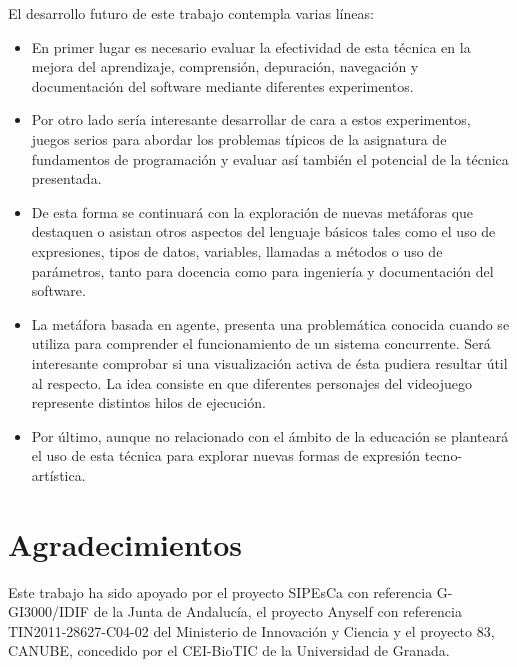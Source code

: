 \documentclass{llncs}
\begin{document}
El desarrollo futuro de este trabajo contempla varias líneas:
\begin{itemize}
\item En primer lugar es necesario evaluar la efectividad de esta técnica en la mejora del aprendizaje, comprensión, depuración, navegación y documentación del software mediante diferentes experimentos.
\item Por otro lado sería interesante desarrollar de cara a estos experimentos, juegos serios para abordar los problemas típicos de la asignatura de fundamentos de programación y evaluar así también el potencial de la técnica presentada.
\item De esta forma se continuará con la exploración de nuevas metáforas que destaquen o asistan otros aspectos del lenguaje básicos tales como el uso de expresiones, tipos de datos, variables, llamadas a métodos o uso de parámetros, tanto para docencia como para ingeniería y documentación del software.

\item La metáfora basada en agente, presenta una problemática conocida cuando se utiliza para comprender el funcionamiento de un sistema concurrente. Será interesante comprobar si una visualización activa de ésta pudiera resultar útil al respecto. La idea consiste en que diferentes personajes del videojuego represente distintos hilos de ejecución.
 



\item Por último, aunque no relacionado con el ámbito de la educación se planteará el uso de esta técnica para explorar nuevas formas de expresión tecno-artística.
\end{itemize}





\section*{Agradecimientos}
Este trabajo ha sido apoyado por el proyecto SIPEsCa con
referencia G-GI3000/IDIF de la Junta de Andalucía, el proyecto Anyself
con referencia TIN2011-28627-C04-02 del Ministerio de Innovación y
Ciencia y el proyecto 83, CANUBE, concedido por el CEI-BioTIC de la
Universidad de Granada. 





\end{document}

